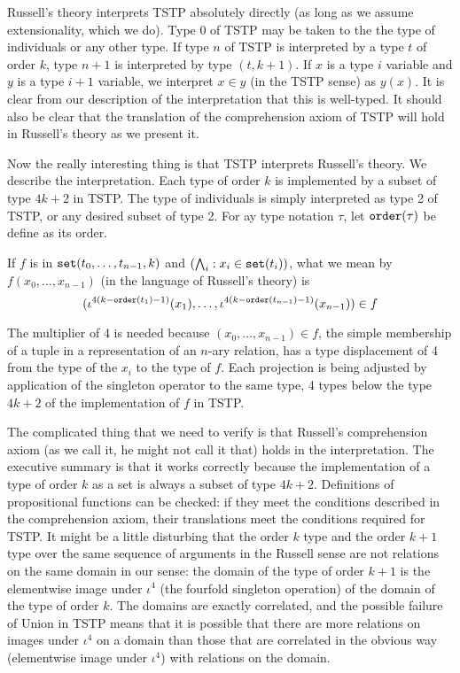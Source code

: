 \documentclass[12pt]{article}
\begin{document}
Russell's theory interprets TSTP absolutely directly (as long as we assume extensionality, which we do).  Type 0 of TSTP may be taken to the the type of individuals or any other type.  If type $n$ of TSTP is interpreted by a type $t$ of order $k$,
type $n+1$ is interpreted by type $(t,k+1)$.  If $x$ is a type $i$ variable and $y$ is a type $i+1$ variable,
we interpret $x\in y$ (in the TSTP sense) as $y(x)$.  It is clear from our description of the interpretation that this is well-typed.  It should also be clear that the translation of the comprehension axiom of TSTP will hold in Russell's theory as we present it.

Now the really interesting thing is that TSTP interprets Russell's theory.  We describe the interpretation.
	Each type of order $k$ is implemented by a subset of type $4k+2$ in TSTP.  The type of individuals is simply interpreted as type 2 of TSTP, or any desired subset of type 2.  For ay type notation $\tau$, let ${\tt order}(\tau)$ be define as its order.

If $f$ is in ${\tt set}(t_0,\ldots,t_{n-1},k)$ and $(\bigwedge_i:x_i \in {\tt set}(t_i))$, what we mean by
$f(x_0,\ldots,x_{n-1})$ (in the language of Russell's theory) is $$(\iota^{4(k-{\tt order}(t_1)-1)}(x_1),\ldots,\iota^{4(k-{\tt order}(t_{n-1})-1)}(x_{n-1})) \in f$$

The multiplier of 4 is needed because $(x_0,\ldots,x_{n-1})\in f$, the simple membership of a tuple in a representation of an $n$-ary relation, has a type displacement of 4 from the type of the $x_i$ to the type of $f$.  Each projection is being adjusted by application of the singleton operator to the same type, 4 types below the type $4k+2$ of the implementation of $f$ in TSTP.

The complicated thing that we need to verify is that Russell's comprehension axiom (as we call it, he might not call it that) holds in the interpretation.  The executive summary is that it works correctly because the implementation of
a type of order $k$ as a set is always a subset of type $4k+2$.  Definitions of propositional functions can be checked:  if they meet the conditions described in the comprehension axiom, their translations meet the conditions required for TSTP.  It might be a little disturbing that the order $k$ type and the order $k+1$ type over the same sequence of arguments in the Russell sense are not relations on the same domain in our sense:  the domain of the type of order $k+1$ is the elementwise image under $\iota^4$ (the fourfold singleton operation) of the domain of the type of order $k$.  The domains are exactly correlated, and the possible failure of Union in TSTP means that it is possible that there are more relations on images under $\iota^4$ on a domain than those that are correlated in the obvious way (elementwise image under $\iota^4$) with relations on the domain.
\end{document}
